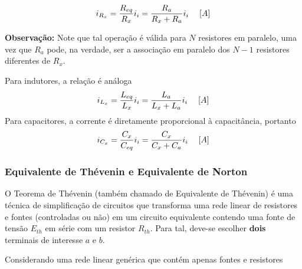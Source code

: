 \documentclass{article}
\numberwithin{equation}{section}
\begin{document}
\begin{center}
\end{center}

\begin{equation}
    i_{R_x}=\frac{R_{eq}}{R_{x}}i_{i}=\frac{R_{a}}{R_{x}+R_{a}}i_{i} \hspace{0.45cm}[A]
\end{equation}

\vspace{2mm}

    \textbf{Observação:} Note que tal operação é válida para $N$ resistores em paralelo, uma vez que $R_a$ pode, na verdade, ser a associação em paralelo dos $N-1$ resistores diferentes de $R_x$.

\vspace{4mm}

\justifying

\noindent Para indutores, a relação é análoga
\begin{equation}
    i_{L_x}=\frac{L_{eq}}{L_{x}}i_{i}=\frac{L_{a}}{L_{x}+L_{a}}i_{i} \hspace{0.45cm}[A]
\end{equation}
Para capacitores, a corrente é diretamente proporcional à capacitância, portanto
\begin{equation}
    i_{C_x}=\frac{C_{x}}{C_{eq}}i_{i}=\frac{C_{x}}{C_{x}+C_{a}}i_{i} \hspace{0.45cm}[A]
\end{equation}

\subsubsection{Equivalente de Thévenin e Equivalente de Norton}
\label{subsubsec:thevenin}
O Teorema de Thévenin (também chamado de Equivalente de Thévenin) é uma técnica de simplificação de circuitos que transforma uma rede linear de resistores e fontes (controladas ou não) em um circuito equivalente contendo uma fonte de tensão $E_{th}$ em série com um resistor $R_{th}$. Para tal, deve-se escolher \textbf{dois} terminais de interesse $a$ e $b$.

Considerando uma rede linear genérica que contém apenas fontes e resistores
\end{document}
